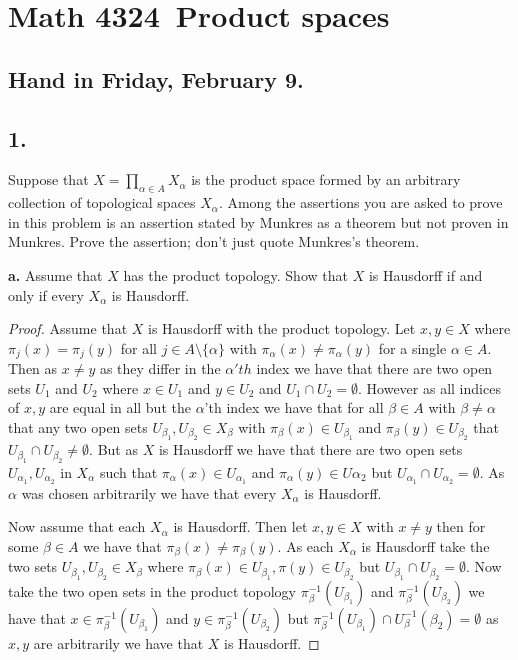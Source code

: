 \documentclass{amsart}
\theoremstyle{plain}
\theoremstyle{definition}
\theoremstyle{remark}
\begin{document}
\section*{Math 4324\  Product spaces } 

\subsection*{Hand in Friday, February 9.} 
\vspace{.15in}


\noindent
\subsection*{1.}  Suppose that  $X = \prod _{\alpha \in A} X_{\alpha}$ is the product space formed by an arbitrary collection of topological spaces $X_{\alpha}$. Among the assertions you are asked to prove in this problem is an assertion stated by Munkres as a theorem but not proven in Munkres. Prove the assertion; don't just quote Munkres's theorem. 

\vspace{.1in}
{\bfseries a.} Assume that $X$ has the product topology. Show that $X$ is Hausdorff if and only if every $X_{\alpha}$ is Hausdorff. 


\begin{proof}
    Assume that $X$ is Hausdorff with the product topology. Let $x,y\in X$ where $\pi_j(x)=\pi_j(y)$ for all $j\in A\setminus \{\alpha\}$ with $\pi_\alpha(x) \not = \pi_\alpha(y)$ for a single $\alpha \in A$. Then as $x\not = y$ as they differ in the $\alpha'th$ index we have that there are two open sets $U_1$ and $U_2$ where $x\in U_1$ and $y\in U_2$ and $U_1\cap U_2 =\emptyset$. However as all indices of $x,y$ are equal in all but the $\alpha$'th index we have that for all $\beta \in A$ with $\beta\not = \alpha$ that any two open sets $U_{\beta_1},U_{\beta_2}\in X_\beta$ with $\pi_\beta(x)\in U_{\beta_1}$ and $\pi_\beta(y)\in U_{\beta_2}$ that $U_{\beta_1}\cap U_{\beta_2}\not = \emptyset$. But as $X$ is Hausdorff we have that there are two open sets $U_{\alpha_1}, U_{\alpha_2}$ in $X_\alpha$ such that $\pi_\alpha(x) \in U_{\alpha_1}$ and $\pi_\alpha(y) \in U{\alpha_2}$ but $U_{\alpha_1}\cap U_{\alpha_2}=\emptyset$. As $\alpha$ was chosen arbitrarily we have that every $X_\alpha$ is Hausdorff. 

    Now assume that each $X_\alpha$ is Hausdorff. Then let $x,y\in X$ with $x\not = y$ then for some $\beta\in A$ we have that $\pi_\beta(x)\not = \pi_\beta(y)$. As each $X_\alpha$ is Hausdorff take the two sets $U_{\beta_1},U_{\beta_2}\in X_\beta$ where $\pi_\beta(x) \in U_{\beta_1},\pi(y) \in U_{\beta_2}$ but $U_{\beta_1}\cap U_{\beta_2}=\emptyset$. Now take the two open sets in the product topology $\pi_{\beta}^{-1}(U_{\beta_1})$ and $\pi_{\beta}^{-1}(U_{\beta_2})$ we have that $x\in\pi_{\beta}^{-1}(U_{\beta_1}) $ and $y\in\pi_{\beta}^{-1}(U_{\beta_2})$ but $\pi_{\beta}^{-1}(U_{\beta_1})\cap U_\beta^{-1}(\beta_2)=\emptyset$ as $x,y$ are arbitrarily we have that $X$ is Hausdorff.
    

\end{proof}
\end{document}
